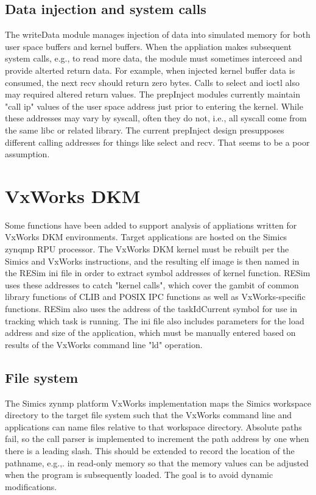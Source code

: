 \documentclass[titlepage]{article}
\begin{document}
\begin{appendices}
\subsection{Data injection and system calls}
The writeData module manages injection of data into simulated memory for both user space buffers and kernel buffers.  When the appliation makes subsequent system calls,
e.g., to read more data, the module must sometimes interceed and provide alterted return data. For example, when injected kernel buffer data is consumed, the next
recv should return zero bytes.  Calls to select and ioctl also may required altered return values.  The prepInject modules currently maintain "call ip" values of
the user space address just prior to entering the kernel.  While these addresses may vary by syscall, often they do not, i.e., all syscall come from the same libc
or related library.  The current prepInject design presupposes different calling addresses for things like select and recv.  That seems to be a poor assumption.  

\section{VxWorks DKM}
Some functions have been added to support analysis of appliations written for VxWorks DKM environments.  Target applications are hosted on 
the Simics zynqmp RPU processor.  The VxWorks DKM kernel must be rebuilt per the Simics and VxWorks instructions, and the resulting elf image is then
named in the RESim ini file in order to extract symbol addresses of kernel function. RESim uses these addresses to catch "kernel calls", which cover the gambit of common library
functions of CLIB and POSIX IPC functions as well as VxWorks-specific functions. RESim also uses the address of the taskIdCurrent symbol for use in tracking
which task is running.  The ini file also includes parameters for the load address and size of the application, which must be manually entered based on results of the
VxWorks command line "ld" operation.   

\subsection {File system}
The Simics zynmp platform VxWorks implementation maps the Simics workspace directory to the target file system such that the VxWorks command line and applications can name files 
relative to that workspace directory.  Absolute paths fail, so the call parser is implemented to increment the path address by one when there is a leading slash.  This should
be extended to record the location of the pathname, e.g.,. in read-only memory so that the memory values can be adjusted when the program is subsequently loaded.  The goal is
to avoid dynamic modifications.


\end{appendices}
\end{document}

